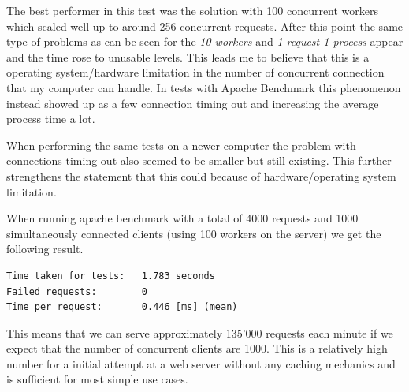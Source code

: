 The best performer in this test was the solution with 100 concurrent workers which scaled well up to around 256 concurrent requests. After this point the same type of problems as can be seen for the \textit{10 workers} and \textit{1 request-1 process} appear and the time rose to unusable levels. This leads me to believe that this is a operating system/hardware limitation in the number of concurrent connection that my computer can handle. In tests with Apache Benchmark this phenomenon instead showed up as a few connection timing out and increasing the average process time a lot.

When performing the same tests on a newer computer the problem with connections timing out also seemed to be smaller but still existing. This further strengthens the statement that this could because of hardware/operating system limitation.

When running apache benchmark with a total of 4000 requests and 1000 simultaneously connected clients (using 100 workers on the server) we get the following result.

\begin{lstlisting}
Time taken for tests:   1.783 seconds
Failed requests:        0
Time per request:       0.446 [ms] (mean)
\end{lstlisting}

This means that we can serve approximately 135'000 requests each minute if we expect that the number of concurrent clients are 1000. This is a relatively high number for a initial attempt at a web server without any caching mechanics and is sufficient for most simple use cases.



